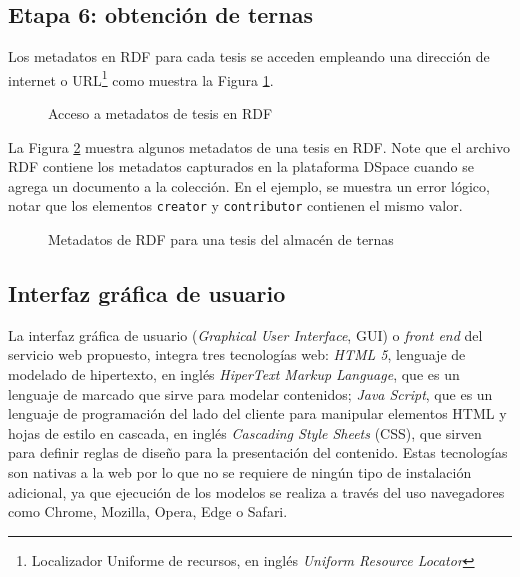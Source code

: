 \subsection{Etapa 6: obtenci\'on de ternas}

Los metadatos en RDF para cada tesis se acceden empleando una direcci\'on de internet o URL\footnote{Localizador Uniforme de recursos, en ingl\'es \textit{Uniform Resource Locator}} como muestra la Figura \ref{accesoRdf}.\newline

\begin{figure}[!ht]
	\centering
    \caption{Acceso a metadatos de tesis en RDF}
    \label{accesoRdf}
\end{figure}

La Figura \ref{resultadoRdf} muestra algunos metadatos de una tesis en RDF. Note que el archivo RDF contiene los metadatos capturados en la plataforma DSpace cuando se agrega un documento a la colecci\'on. En el ejemplo, se muestra un error l\'ogico, notar que los elementos \texttt{creator} y \texttt{contributor} contienen el mismo valor.

\begin{figure}[!ht]
	\centering
    \caption{Metadatos de RDF para una tesis del almac\'en de ternas}
    \label{resultadoRdf}
\end{figure}

\subsection{Interfaz gr\'afica de usuario}

La interfaz gr\'afica de usuario (\emph{Graphical User Interface}, GUI) o \emph{front end} del servicio web propuesto, integra tres tecnolog\'ias web: 
\emph{HTML 5}, lenguaje de modelado de hipertexto, en ingl\'es \emph{HiperText Markup Language}, que es un lenguaje de marcado que sirve para modelar contenidos; \emph{Java Script}, que es un lenguaje de programaci\'on del lado del cliente para manipular elementos HTML y hojas de estilo en cascada, en ingl\'es \emph{Cascading Style Sheets} (CSS), que sirven para definir reglas de dise\~{n}o para la presentaci\'on del contenido. Estas tecnolog\'ias son nativas a la web por lo que no se requiere de ning\'un tipo de instalaci\'on adicional, ya que ejecuci\'on de los modelos se realiza a trav\'es del uso navegadores como  Chrome, Mozilla, Opera, Edge o Safari.

